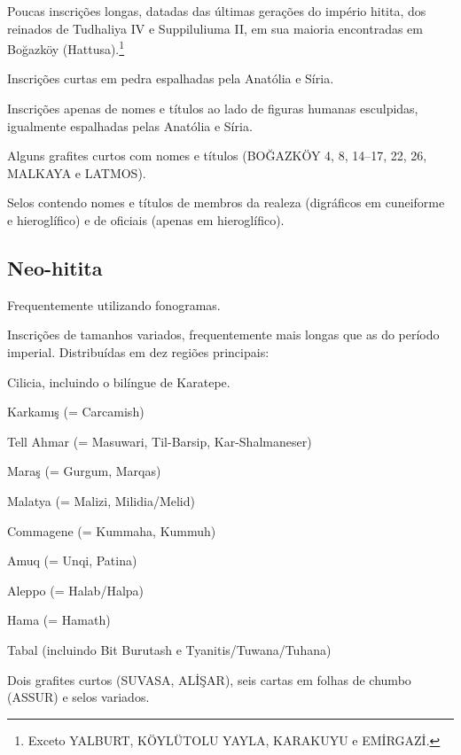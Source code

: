 \documentclass[article]{luvita}
\begin{document}
\begin{compactitem}
	\item Poucas inscrições longas, datadas das últimas gerações do império
	hitita, dos reinados de Tudhaliya IV e Suppiluliuma II, em sua maioria
	encontradas em Boğazköy (Hattusa).\footnote{Exceto YALBURT, KÖYLÜTOLU YAYLA,
		KARAKUYU e EMİRGAZİ.}
	\item Inscrições curtas em pedra espalhadas pela Anatólia e Síria.
	\item Inscrições apenas de nomes e títulos ao lado de figuras humanas
	esculpidas, igualmente espalhadas pelas Anatólia e Síria.
	\item Alguns grafites curtos com nomes e títulos (BOĞAZKÖY 4, 8, 14--17, 22,
	26, MALKAYA e LATMOS).
	\item Selos contendo nomes e títulos de membros da realeza (digráficos em
	cuneiforme e hieroglífico) e de oficiais (apenas em hieroglífico).
\end{compactitem}

\subsection{Neo-hitita}

Frequentemente utilizando fonogramas.

\begin{compactitem}
	\item Inscrições de tamanhos variados, frequentemente mais longas que as do
	período imperial. Distribuídas em dez regiões principais:
	\begin{compactenum}
		\item Cilicia, incluindo o bilíngue de Karatepe.
		\item Karkamış (= Carcamish)
		\item Tell Ahmar (= Masuwari, Til-Barsip, Kar-Shalmaneser)
		\item Maraş (= Gurgum, Marqas)
		\item Malatya (= Malizi, Milidia\slash{}Melid)
		\item Commagene (= Kummaha, Kummuh)
		\item Amuq (= Unqi, Patina)
		\item Aleppo (= Halab\slash{}Halpa)
		\item Hama (= Hamath)
		\item Tabal (incluindo Bit Burutash e Tyanitis\slash{}Tuwana\slash{}Tuhana)
	\end{compactenum}
	\item Dois grafites curtos (SUVASA, ALİŞAR), seis cartas em folhas de chumbo (ASSUR)
	e selos variados.
\end{compactitem}
\end{document}
